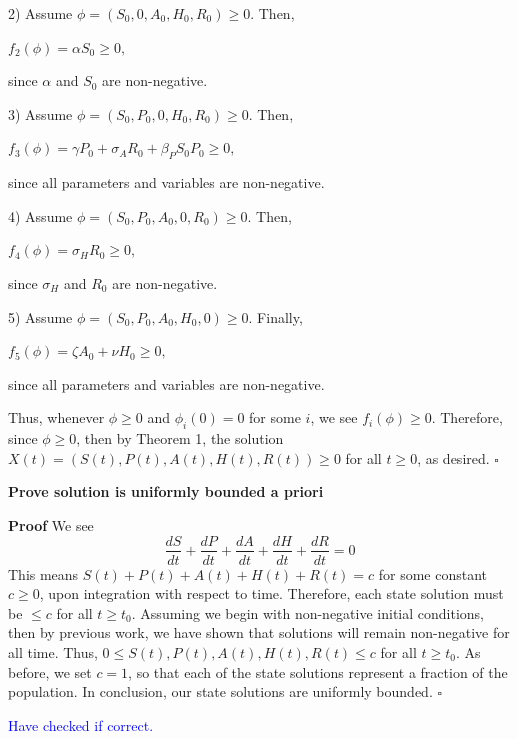 \documentclass[12pt]{article}
\begin{document}
2) Assume $\phi = (S_0, 0, A_0, H_0, R_0) \geq 0.$ Then, 
\begin{center}
$f_2(\phi)=\alpha S_0 \geq 0,$
\end{center}
since $\alpha$ and $S_0$ are non-negative. 

3) Assume $\phi = (S_0, P_0, 0, H_0, R_0) \geq 0.$ Then,
\begin{center}
$f_3(\phi)=\gamma P_0 +\sigma_A R_0 + \beta_{P} S_0 P_0 \geq 0,$
\end{center}
since all parameters and variables are non-negative. 
 
4) Assume $\phi = (S_0, P_0, A_0, 0, R_0) \geq 0.$ Then,
\begin{center}
$f_4(\phi)=\sigma_H R_0 \geq 0,$
\end{center}
since $\sigma_H$ and $R_0$ are non-negative. 
 
5)  Assume $\phi = (S_0, P_0, A_0, H_0, 0) \geq 0.$ Finally,
\begin{center}
$f_5(\phi)=\zeta A_0 +\nu H_0 \geq 0,$
\end{center}
since all parameters and variables are non-negative. 

Thus, whenever $\phi \geq 0$ and $\phi_i(0)=0$ for some $i$, we see $f_i(\phi) \geq 0$. Therefore, since $\phi \geq 0$,  then by Theorem 1, the solution $X(t)=(S(t), P(t), A(t), H(t), R(t)) \geq 0$ for all $t \geq 0$, as desired. $\square$




 \textbf{Prove solution is uniformly bounded a priori}

 \textbf{Proof} We see $$\frac{dS}{dt} + \frac{dP}{dt} + \frac{dA}{dt} +\frac{dH}{dt} +\frac{dR}{dt} = 0$$
This means  $S(t) + P(t) + A(t) + H(t) +R(t) = c$ for some constant $c \geq 0$, upon integration with respect to time. Therefore, each state solution must be $\leq c$ for all $t \geq t_0$. Assuming we begin with non-negative initial conditions, then by previous work, we have shown that solutions will remain non-negative for all time. Thus, $0 \leq S(t), P(t), A(t), H(t), R(t) \leq c$ for all $t \geq t_0.$ As before, we set $c=1$, so that each of the state solutions represent a fraction of the population. In conclusion, our state solutions are uniformly bounded. $\square$
 
 \textcolor{blue}{Have checked if correct.}

 
\end{document}
